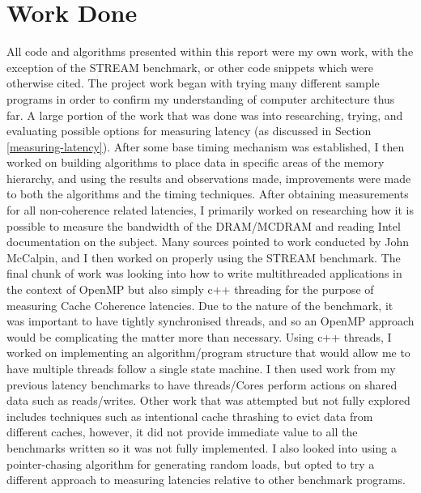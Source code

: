 \documentclass[bsc,frontabs,twoside,singlespacing,parskip,deptreport]{infthesis}     %
\begin{document}
\section{Work Done}
All code and algorithms presented within this report were my own work, with the exception of the STREAM benchmark, or other code snippets which were otherwise cited. The project work began with trying many different sample programs in order to confirm my understanding of computer architecture thus far. A large portion of the work that was done was into researching, trying, and evaluating possible options for measuring latency (as discussed in Section \ref{measuring-latency}). After some base timing mechanism was established, I then worked on building algorithms to place data in specific areas of the memory hierarchy, and using the results and observations made, improvements were made to both the algorithms and the timing techniques. After obtaining measurements for all non-coherence related latencies, I primarily worked on researching how it is possible to measure the bandwidth of the DRAM/MCDRAM and reading Intel documentation on the subject. Many sources pointed to work conducted by John McCalpin, and I then worked on properly using the STREAM benchmark. The final chunk of work was looking into how to write multithreaded applications in the context of OpenMP but also simply c++ threading for the purpose of measuring Cache Coherence latencies. Due to the nature of the benchmark, it was important to have tightly synchronised threads, and so an OpenMP approach would be complicating the matter more than necessary. Using c++ threads, I worked on implementing an algorithm/program structure that would allow me to have multiple threads follow a single state machine. I then used work from my previous latency benchmarks to have threads/Cores perform actions on shared data such as reads/writes. Other work that was attempted but not fully explored includes techniques such as intentional cache thrashing to evict data from different caches, however, it did not provide immediate value to all the benchmarks written so it was not fully implemented. I also looked into using a pointer-chasing algorithm for generating random loads, but opted to try a different approach to measuring latencies relative to other benchmark programs. 
\end{document}
